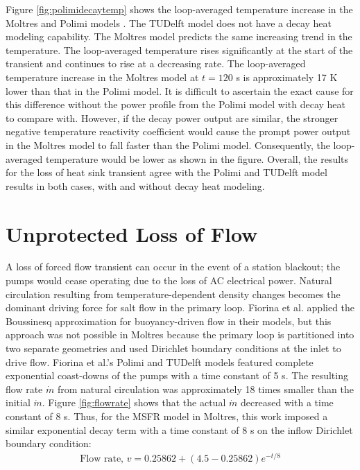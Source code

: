 Figure \ref{fig:polimidecaytemp} shows the loop-averaged temperature
increase in the Moltres and Polimi models \cite{fiorina_modelling_2014}. The
TUDelft model does not have a decay heat modeling capability. The Moltres
model predicts the same increasing trend in the temperature. The loop-averaged
temperature rises significantly at the start of the transient and continues to
rise at a decreasing rate. The loop-averaged temperature increase in the
Moltres model at $t=120$ s is approximately 17 K lower than that in the Polimi
model. It is difficult to ascertain the exact cause for this difference
without the power profile from the Polimi model with decay heat to compare
with. However, if the decay power output are similar, the stronger negative
temperature reactivity coefficient would cause the prompt power output in the
Moltres model to fall faster than the Polimi model. Consequently, the
loop-averaged temperature would be lower as shown in the figure. Overall, the
results for the loss of heat sink transient agree with the Polimi and TUDelft
model results in both cases, with and without decay heat modeling.

\clearpage

\section{Unprotected Loss of Flow}

A loss of forced flow transient can occur in the event of a station
blackout; the pumps would cease operating due to the loss of AC electrical
power. Natural circulation resulting from temperature-dependent density
changes becomes the dominant driving force for salt flow in the primary loop.
Fiorina et al. \cite{fiorina_modelling_2014} applied the Boussinesq
approximation for buoyancy-driven flow in their models, but this approach was
not possible in Moltres because the primary loop is partitioned into two
separate geometries and used Dirichlet boundary
conditions at the inlet to drive flow. Fiorina et al.'s Polimi and TUDelft
models featured complete exponential coast-downs of the pumps with a time
constant of 5 s. The resulting flow rate $\dot{m}$ from natural circulation
was approximately 18 times smaller than the initial $\dot{m}$. Figure
\ref{fig:flowrate} shows that the actual $\dot{m}$ decreased with a time
constant of 8 s. Thus, for the \gls{MSFR} model in Moltres, this work imposed
a similar exponential decay term with a time constant of 8 s on the inflow
Dirichlet boundary condition:
%
\begin{align}
    \text{Flow rate, } v = 0.25862 + (4.5-0.25862) e^{-t/8} 
    \label{eq:flowrate}
\end{align}

